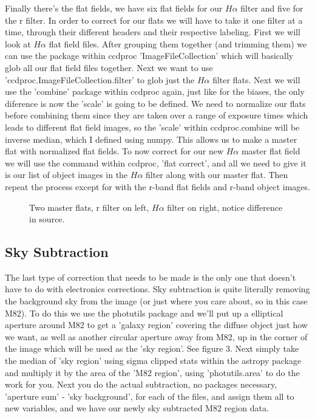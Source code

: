 \documentclass[modern]{aastex63}
\begin{document}
Finally there's the flat fields, we have six flat fields for our $H\alpha$ filter and five for the r filter. In order to correct for our flats we will have to take it one filter at a time, through their different headers and their respective labeling. First we will look at $H\alpha$ flat field files. After grouping them together (and trimming them) we can use the package within ccdproc 'ImageFileCollection' which will basically glob all our flat field files together. Next we want to use 'ccdproc.ImageFileCollection.filter' to glob just the $H\alpha$ filter flats. Next we will use the 'combine' package within ccdproc again, just like for the biases, the only diference is now the 'scale' is going to be defined. We need to normalize our flats before combining them since they are taken over a range of exposure times which leads to different flat field images, so the 'scale' within ccdproc.combine will be inverse median, which I defined using numpy. This allows us to make a master flat with normalized flat fields. To now correct for our new $H\alpha$ master flat field we will use the command within ccdproc, 'flat correct', and all we need to give it is our list of object images in the $H\alpha$ filter along with our master flat. Then repeat the process except for with the r-band flat fields and r-band object images.

\begin{figure}[htb!]
\caption{Two master flats, r filter on left, $H\alpha$ filter on right, notice difference in source. \label{fig:f2}\label{fig:f4}}
\end{figure}

\subsection{Sky Subtraction}

The last type of correction that needs to be made is the only one that doesn't have to do with electronics corrections. Sky subtraction is quite literally removing the background sky from the image (or just where you care about, so in this case M82). To do this we use the photutils package and we'll put up a elliptical aperture around M82 to get a 'galaxy region' covering the diffuse object just how we want, as well as another circular aperture away from M82, up in the corner of the image which will be used as the 'sky region'. See figure 3.  Next simply take the median of 'sky region' using sigma clipped stats within the astropy package and multiply it by the area of the 'M82 region', using 'photutils.area' to do the work for you. Next you do the actual subtraction, no packages necessary, 'aperture sum' - 'sky background', for each of the files, and assign them all to new variables, and we have our newly sky subtracted M82 region data.
\end{document}
